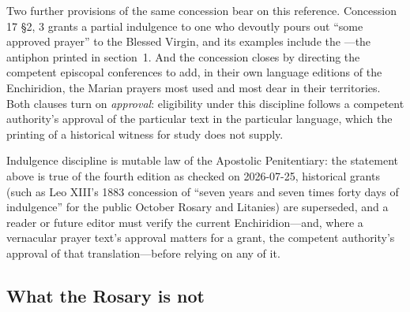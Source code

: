 Two further provisions of the same concession bear on this reference.
Concession 17 \S 2, 3\textdegree{} grants a partial indulgence to one who
devoutly pours out ``some approved prayer'' to the Blessed Virgin, and
its examples include the ---the antiphon printed in
section~1. And the concession closes by directing the competent
episcopal conferences to add, in their own language editions of the
Enchiridion, the Marian prayers most used and most dear in their
territories. Both clauses turn on \emph{approval}: eligibility under
this discipline follows a competent authority's approval of the
particular text in the particular language, which the printing of a
historical witness for study does not
supply.

Indulgence discipline is mutable law of the Apostolic Penitentiary: the
statement above is true of the fourth edition as checked on 2026-07-25,
historical grants (such as Leo XIII's 1883 concession of ``seven years
and seven times forty days of indulgence'' for the public October
Rosary and Litanies) are superseded, and
a reader or future editor must verify the current Enchiridion---and,
where a vernacular prayer text's approval matters for a grant, the
competent authority's approval of that translation---before relying on
any of it.

\subsection{What the Rosary is not}

